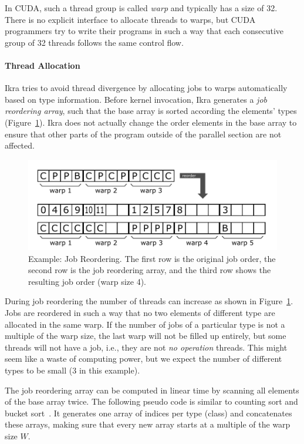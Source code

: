 \documentclass[preprint]{sigplanconf}
\begin{document}
In CUDA, such a thread group is called \emph{warp} and typically has a size of 32. There is no explicit interface to allocate threads to warps, but CUDA programmers try to write their programs in such a way that each consecutive group of 32 threads follows the same control flow.

\paragraph{Thread Allocation}
Ikra tries to avoid thread divergence by allocating jobs to warps automatically based on type information. Before kernel invocation, Ikra generates a \emph{job reordering array}, such that the base array is sorted according the elements' types (Figure~\ref{fig:ex_job_reorder}). Ikra does not actually change the order elements in the base array to ensure that other parts of the program outside of the parallel section are not affected.

\begin{figure}[!htp]
    \centering
    \includegraphics[width=\columnwidth]{reorder_example.pdf}
    \caption{Example: Job Reordering. The first row is the original job order, the second row is the job reordering array, and the third row shows the resulting job order (warp size 4).}
    \label{fig:ex_job_reorder}
\end{figure}

During job reordering the number of threads can increase as shown in Figure~\ref{fig:ex_job_reorder}. Jobs are reordered in such a way that no two elements of different type are allocated in the same warp. If the number of jobs of a particular type is not a multiple of the warp size, the last warp will not be filled up entirely, but some threads will not have a job, i.e., they are not \emph{no operation} threads. This might seem like a waste of computing power, but we expect the number of different types to be small (3 in this example).

The job reordering array can be computed in linear time by scanning all elements of the base array twice. The following pseudo code is similar to counting sort and bucket sort~\cite{Corwin:2004:SLT:1040231.1040257}. It generates one array of indices per type (class) and concatenates these arrays, making sure that every new array starts at a multiple of the warp size $W$.
\end{document}

